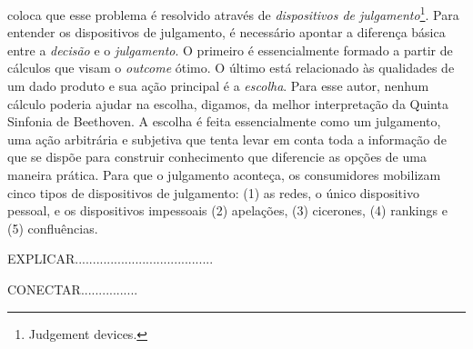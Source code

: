 \documentclass[a4paper, 12pt, openright, oneside, german, french, english, brazil]{abntex2}
\begin{document}
	
	 coloca que esse problema é resolvido através de \textit{dispositivos de julgamento}\footnote{Judgement devices.}. Para entender os dispositivos de julgamento, é necessário apontar a diferença básica entre a \textit{decisão} e o \textit{julgamento}. O primeiro é essencialmente formado a partir de cálculos que visam o \textit{outcome} ótimo. O último está relacionado às qualidades de um dado produto e sua ação principal é a \textit{escolha}. Para esse autor, nenhum cálculo poderia ajudar na escolha, digamos, da melhor interpretação da Quinta Sinfonia de Beethoven. A escolha é feita essencialmente como um julgamento, uma ação arbitrária e subjetiva que tenta levar em conta toda a informação de que se dispõe para construir conhecimento que diferencie as opções de uma maneira prática. Para que o julgamento aconteça, os consumidores mobilizam cinco tipos de dispositivos de julgamento: (1) as redes, o único dispositivo pessoal, e os dispositivos impessoais (2) apelações, (3) cicerones, (4) rankings e (5) confluências.
	
	
	EXPLICAR.......................................
	
	
	
	CONECTAR................
	
	
\end{document}
